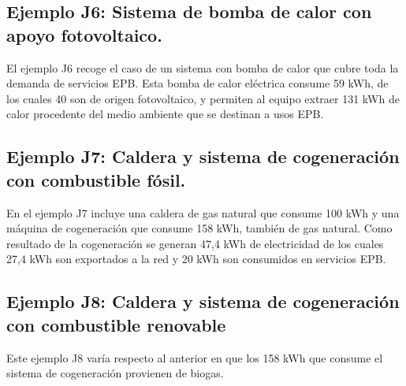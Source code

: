 \documentclass[10pt,notitlepage,oneside,a4paper]{article}
\begin{document}




\subsection{Ejemplo J6: Sistema de bomba de calor con apoyo fotovoltaico.}
El ejemplo J6 recoge el caso de un sistema con bomba de calor que cubre toda la demanda de servicios EPB. Esta bomba de calor eléctrica consume 59 kWh, de los cuales 40 son de origen fotovoltaico, y permiten al equipo extraer 131 kWh de calor procedente del medio ambiente que se destinan a usos EPB.





\subsection{Ejemplo J7: Caldera y sistema de cogeneración con combustible fósil.}
En el ejemplo J7 incluye una caldera de gas natural que consume 100 kWh y una máquina de cogeneración que consume 158 kWh, también de gas natural. Como resultado de la cogeneración se generan 47,4 kWh de electricidad de los cuales 27,4 kWh son exportados a la red y 20 kWh son consumidos en servicios EPB.





\subsection{Ejemplo J8: Caldera y sistema de cogeneración con combustible renovable}
Este ejemplo J8 varía respecto al anterior en que los 158 kWh que consume el sistema de cogeneración provienen de biogas.
\end{document}
